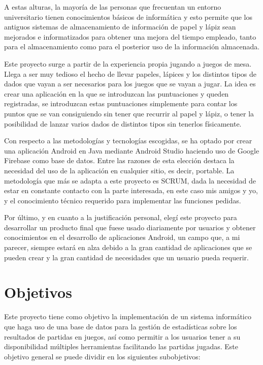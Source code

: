 A estas alturas, la mayoría de las personas que frecuentan un entorno universitario tienen conocimientos básicos de informática y esto permite que los antiguos sistemas de almacenamiento de información de papel y lápiz sean mejorados e informatizados para obtener una mejora del tiempo empleado, tanto para el almacenamiento como para el posterior uso de la información almacenada.

Este proyecto surge a partir de la experiencia propia jugando a juegos de mesa. Llega a ser muy tedioso el hecho de llevar papeles, lápices y los distintos tipos de dados que vayan a ser necesarios para los juegos que se vayan a jugar. La idea es crear una aplicación en la que se introduzcan las puntuaciones y queden registradas, se introduzcan estas puntuaciones simplemente para contar los puntos que se van consiguiendo sin tener que recurrir al papel y lápiz, o tener la posibilidad de lanzar varios dados de distintos tipos sin tenerlos físicamente.

Con respecto a las metodologías y tecnologías escogidas, se ha optado por crear una aplicación Android en Java mediante Android Studio haciendo uso de Google Firebase como base de datos. Entre las razones de esta elección destaca la necesidad del uso de la aplicación en cualquier sitio, es decir, portable. La metodología que más se adapta a este proyecto es SCRUM, dada la necesidad de estar en constante contacto con la parte interesada, en este caso mis amigos y yo, y el conocimiento técnico requerido para implementar las funciones pedidas.

Por último, y en cuanto a la justificación personal, elegí este proyecto para desarrollar un producto final que fuese usado diariamente por usuarios y obtener conocimientos en el desarrollo de aplicaciones Android, un campo que, a mi parecer, siempre estará en alza debido a la gran cantidad de aplicaciones que se pueden crear y la gran cantidad de necesidades que un usuario pueda requerir. 

\newpage

\section{Objetivos}

Este proyecto tiene como objetivo la implementación de un sistema informático que haga uso de una base de datos para la gestión de estadísticas sobre los resultados de partidas en juegos, así como permitir a los usuarios tener a su disponibilidad múltiples herramientas facilitando las partidas jugadas. Este objetivo general se puede dividir en los siguientes subobjetivos:


